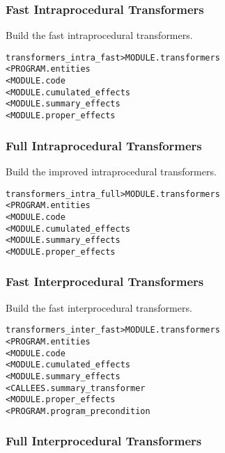\documentclass[a4paper]{report}
\newenvironment{PipsMake}{\begin{alltt}}{\end{alltt}}
\newenvironment{PipsPass}[1]{\label{pass:#1}}{}
\begin{document}
\subsubsection{Fast Intraprocedural Transformers}

\begin{PipsPass}{transformers_intra_fast}
Build the fast intraprocedural transformers.
\end{PipsPass}

\begin{PipsMake}
transformers_intra_fast         > MODULE.transformers
        < PROGRAM.entities
        < MODULE.code
        < MODULE.cumulated_effects
        < MODULE.summary_effects
        < MODULE.proper_effects
\end{PipsMake}

\subsubsection{Full Intraprocedural Transformers}

\begin{PipsPass}{transformers_intra_full}
Build the improved intraprocedural transformers.
\end{PipsPass}

\begin{PipsMake}
transformers_intra_full         > MODULE.transformers
        < PROGRAM.entities
        < MODULE.code
        < MODULE.cumulated_effects
        < MODULE.summary_effects
        < MODULE.proper_effects
\end{PipsMake}

\subsubsection{Fast Interprocedural Transformers}

\begin{PipsPass}{transformers_inter_fast}
Build the fast interprocedural transformers.
\end{PipsPass}

\begin{PipsMake}
transformers_inter_fast         > MODULE.transformers
        < PROGRAM.entities
        < MODULE.code
        < MODULE.cumulated_effects
        < MODULE.summary_effects
        < CALLEES.summary_transformer
        < MODULE.proper_effects
        < PROGRAM.program_precondition
\end{PipsMake}

\subsubsection{Full Interprocedural Transformers}
\end{document}
